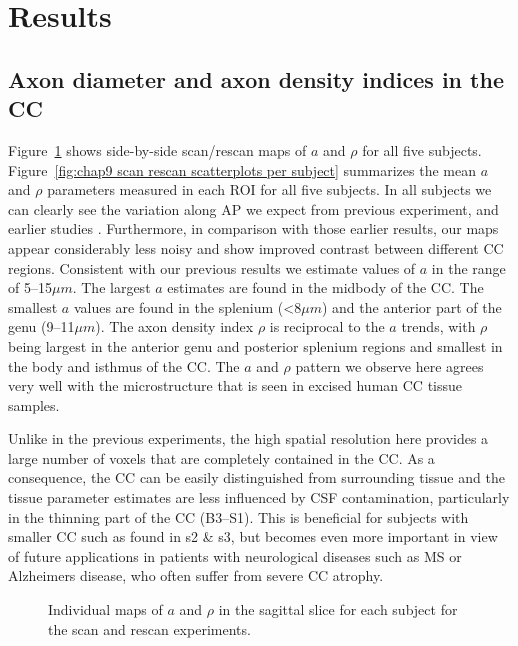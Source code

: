 \FloatBarrier
\section{Results}
\subsection*{Axon diameter and axon density indices in the \gls{CC}}
Figure~\ref{fig:chap9 scan rescan maps per subject} shows side-by-side scan/rescan maps of $a$ and $\rho$ for all five subjects. Figure~\ref{fig:chap9 scan rescan scatterplots per subject} summarizes the mean $a$ and $\rho$ parameters measured in each \gls{ROI} for all five subjects. In all subjects we can clearly see the variation along AP we expect from previous experiment, and earlier studies \citep{Alexander:2010}. Furthermore, in comparison with those earlier results, our maps appear considerably less noisy and show improved contrast between different \gls{CC} regions. Consistent with our previous results we estimate values of $a$ in the range of 5--15$\mu m$. The largest $a$ estimates are found in the midbody of the \gls{CC}. The smallest $a$ values are found in the splenium (<8$\mu m$) and the anterior part of the genu (9--11$\mu m$). The axon density index $\rho$ is reciprocal to the $a$ trends, with $\rho$ being largest in the anterior genu and posterior splenium regions and smallest in the body and isthmus of the \gls{CC}. The $a$ and $\rho$ pattern we observe here agrees very well with the microstructure that is seen in excised human \gls{CC} tissue samples.


Unlike in the previous experiments, the high spatial resolution here provides a large number of voxels that are completely contained in the \gls{CC}. As a consequence, the \gls{CC} can be easily distinguished from surrounding tissue and the tissue parameter estimates are less influenced by CSF contamination, particularly in the thinning part of the \gls{CC} (B3--S1). This is beneficial for subjects with smaller \gls{CC} such as found in s2 \& s3, but becomes even more important in view of future applications in patients with neurological diseases such as MS or Alzheimers disease, who often suffer from severe \gls{CC} atrophy. 
\begin{figure}[ht]
	\centering
	\caption{Individual maps of $a$ and $\rho$ in the sagittal slice for each subject for the scan and rescan experiments.}
	\label{fig:chap9 scan rescan maps per subject}
\end{figure}

